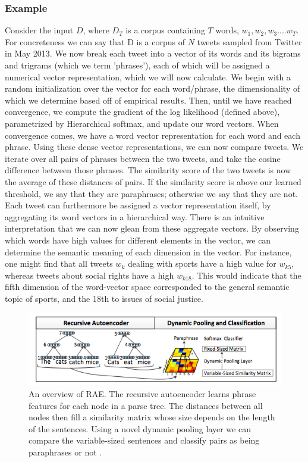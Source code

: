 \documentclass[conference]{IEEEtran}
\begin{document}
\subsubsection{Example}
Consider the input $D$, where $D_T$ is a corpus containing $T$ words, $w_1, w_2, w_3 .... w_T$. For concreteness we can say that D is a corpus of $N$ tweets sampled from Twitter in May 2013.  We now break each tweet into a vector of its words and its bigrams and trigrams (which we term 'phrases'), each of which will be assigned a numerical vector representation, which we will now calculate.  We begin with a random initialization over the vector for each word/phrase, the dimensionality of which we determine based off of empirical results. Then, until we have reached convergence, we compute the gradient of the log likelihood (defined above), parametrized by Hierarchical softmax, and update our word vectors. When convergence comes, we have a word vector representation for each word and each phrase.  
Using these dense vector representations, we can now compare tweets.  We iterate over all pairs of phrases between the two tweets, and take the cosine difference between those phrases.  The similarity score of the two tweets is now the average of these distances of pairs.  If the similarity score is above our learned threshold, we say that they are paraphrases; otherwise we say that they are not.\\

\indent Each tweet can furthermore be assigned a vector representation itself, by aggregating its word vectors in a hierarchical way.  There is an intuitive interpretation that we can now glean from these aggregate vectors.  By observing which words have high values for different elements in the vector, we can determine the semantic meaning of each dimension in the vector. For instance, one might find that all tweets $w_k$ dealing with sports have a high value for $w_{k5}$, whereas tweets about social rights have a high $w_{k18}$. This would indicate that the fifth dimension of the word-vector space corresponded to the general semantic topic of sports, and the 18th to issues of social justice.\\

\begin{figure}
	\label{raefig}
	\centering
	\includegraphics[scale=0.7]{RAE.png}
	\caption{An overview of RAE. The recursive autoencoder learns phrase features
for each node in a parse tree. The distances between all nodes then fill a similarity matrix whose
size depends on the length of the sentences. Using a novel dynamic pooling layer we can compare
the variable-sized sentences and classify pairs as being paraphrases or not \cite{richard}.}
	\label{fig1}
\end{figure}
\end{document}
